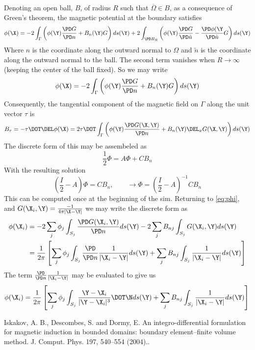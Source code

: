 \documentclass[11pt]{article}
\begin{document}
Denoting an open ball, $B$, of radius $R$ such that $\overline{\Omega}\in B$, as a consequence of Green's theorem, the magnetic potential at the boundary satisfies
\begin{equation}
  \phi(\X) = 
  -2 \int_{\Gamma} \left( \phi(\Y)
  \frac{\PD G}{\PD n} + B_n(\Y) G \right) ds(\Y)
  +2 \int_{\PD B_R} \left( \phi(\Y)
  \frac{\PD G}{\PD \tilde{n}} - \frac{\PD \phi(\Y}{\PD \tilde{n}} G \right) ds(\Y)
\end{equation}
Where $n$ is the coordinate along the outward normal to $\Omega$ and $\tilde{n}$ is the coordinate along the outward normal to the ball. The second term vanishes when $R\rightarrow \infty$ (keeping the center of the ball fixed). So we may write
\begin{equation} \label{eq:phi}
  \phi(\X) = 
  -2 \int_{\Gamma} \left( \phi(\Y)
  \frac{\PD G}{\PD n} + B_n(\Y) G \right) ds(\Y)
\end{equation}
Consequently, the tangential component of the magnetic field on $\Gamma$ along the unit vector $\tau$ is 
\begin{equation}
  B_{\tau} = - \mathbf{\tau} \DOT \DEL \phi(\X) = 
  2 \mathbf{\tau} \DOT
  \int_{\Gamma}
  \left(
  \phi(\Y) \frac{\PD G(\X,\Y)}{\PD n}
  + B_n(\Y) \DEL_x G(\X,\Y)
  \right) ds(\Y)
\end{equation}
The discrete form of this may be assembeled as 
\begin{equation}
  \frac{1}{2} \Phi = A \Phi + C B_n
\end{equation}
With the resulting solution
\begin{equation}
  \left(\frac{I}{2} - A\right)\Phi = C B_n, \qquad
  \rightarrow
  \Phi = \left(\frac{I}{2} - A\right)^{-1} C B_n
\end{equation}
This can be computed once at the beginning of the sim. Returning to \ref{eq:phi}, and $G(\X_i,\Y) = \frac{-1}{4\pi |\X - \Y|}$ we may write the discrete form as
\begin{equation}
\begin{split}
\phi(\X_i) & = -2 \sum_j \phi_j \int_{S_j} \frac{\PD G(\X_i,\Y)}{\PD n} ds(\Y)
           -2 \sum_j B_{nj} \int_{S_j} G(\X_i,\Y) ds(\Y) \\
       & = \frac{1}{2 \pi} 
       \left[
       \sum_j \phi_j \int_{S_j} \frac{\PD}{\PD n} \frac{1}{|\X_i-\Y|} ds(\Y)
     + \sum_j B_{nj} \int_{S_j} \frac{1}{|\X_i-\Y|} ds(\Y)
       \right] \\
\end{split}
\end{equation}
The term $\frac{\PD}{\PD n} \frac{1}{|\X_i-\Y|} $ may be evaluated to give us
\begin{equation}
\phi(\X_i) = \frac{1}{2 \pi} 
       \left[
       \sum_j \phi_j \int_{S_j} \frac{\Y - \X_i}{| \Y - \X_i|^3} \DOT \N ds(\Y)
     + \sum_j B_{nj} \int_{S_j} \frac{1}{|\X_i-\Y|} ds(\Y)
       \right] \\
\end{equation}

\begin{thebibliography}{1}
 Iskakov, A. B., Descombes, S. and Dormy, E. An integro-differential formulation for magnetic induction in bounded domains: boundary element–finite volume method. J. Comput. Phys. 197, 540–554 (2004)..
\end{thebibliography}
\end{document}
